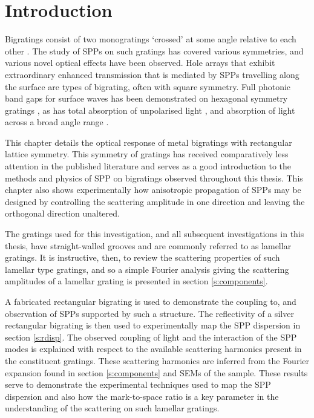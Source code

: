 \section{Introduction}\label{s:rintro}

Bigratings consist of two monogratings `crossed' at some angle relative to each other \cite{Harris1996}. The study of SPPs on such gratings has covered various symmetries, and various novel optical effects have been observed.  Hole arrays that exhibit extraordinary enhanced transmission that is mediated by SPPs travelling along the surface \cite{Barnes2004,Tetz2010,Ebbesen1998} are types of  bigrating, often with square symmetry.  Full photonic band gaps for surface waves has been demonstrated on hexagonal symmetry gratings \cite{Kitson1996}, as has total absorption of unpolarised light \cite{Popov2008}, and absorption of light across a broad angle range \cite{Teperik2008}.

This chapter details the optical response of metal bigratings with rectangular lattice symmetry. This symmetry of gratings has received comparatively less attention in the published literature and serves as a good introduction to the methods and physics of SPP on bigratings observed throughout this thesis. This chapter also shows experimentally how anisotropic propagation of SPPs may be designed by controlling the scattering amplitude in one direction and leaving the orthogonal direction unaltered.

The gratings used for this investigation, and all subsequent investigations in this thesis, have straight-walled grooves and are commonly referred to as lamellar gratings. It is instructive, then, to review the scattering properties of such lamellar type gratings, and so a simple Fourier analysis giving the scattering amplitudes of a lamellar grating is presented in section \ref{s:components}.

A fabricated rectangular bigrating is used to demonstrate the coupling to, and observation of SPPs supported by such a structure. The reflectivity of a silver rectangular bigrating is then used to experimentally map the SPP dispersion in section \ref{s:rdisp}. The observed coupling of light and the interaction of the SPP modes is explained with respect to the available scattering harmonics present in the constituent gratings. These scattering harmonics are inferred from the Fourier expansion found in section \ref{s:components} and SEMs of the sample. These results serve to demonstrate the experimental techniques used to map the SPP dispersion and also how the mark-to-space ratio is a key parameter in the understanding of the scattering on such lamellar gratings.


